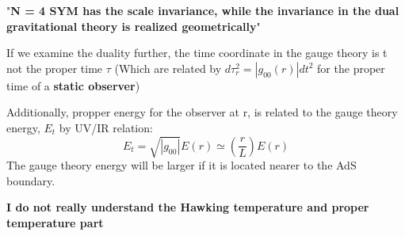 \documentclass[12pt]{article}
\begin{document}
"\textbf{N = 4 SYM has the scale invariance, while the invariance in the dual gravitational theory is realized geometrically}"

\vspace{.5cm}

If we examine the duality further, the time coordinate in the gauge theory is t not the proper time \( \tau \) (Which are related by \(d\tau_r^2 = |g_{00}(r)|dt^2\) for the proper time of a \textbf{static observer})

Additionally, propper energy for the observer at r, is related to the gauge theory energy, \(E_t\) by UV/IR relation:
\begin{equation}
    E_t=\sqrt{|g_{00}|}E(r)\simeq\left(\frac{r}{L}\right)E(r)
\end{equation}
The gauge theory energy will be larger if it is located nearer to the AdS boundary.

\vspace{.5cm}

\textbf{I do not really understand the Hawking temperature and proper temperature part}
\end{document}
